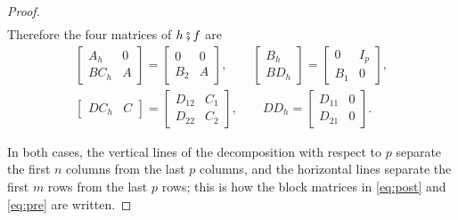 \documentclass[11pt,a4paper]{article}
\theoremstyle{plain}
\theoremstyle{definition}
\theoremstyle{remark}
\newcommand{\then}{\mathbin{\fatsemi}}
\begin{document}
\begin{proof}
\begin{gather*}
    \end{gather*}
    Therefore the four matrices of $h \then f$ are
    \begin{gather*}
        \begin{bmatrix} A_h & 0 \\ B C_h & A \end{bmatrix} = \begin{bmatrix} 0 & 0 \\ B_2 & A \end{bmatrix},
        \qquad
        \begin{bmatrix} B_h \\ B D_h \end{bmatrix} = \begin{bmatrix} 0 & I_p \\ B_1 & 0 \end{bmatrix}, \\
        \begin{bmatrix} D C_h & C \end{bmatrix} = \begin{bmatrix} D_{12} & C_1 \\ D_{22} & C_2 \end{bmatrix},
        \qquad
        D D_h = \begin{bmatrix} D_{11} & 0 \\ D_{21} & 0 \end{bmatrix} .
    \end{gather*}

    In both cases, the vertical lines of the decomposition with respect to $p$ separate the first $n$ columns from the last $p$ columns, and the horizontal lines separate the first $m$ rows from the last $p$ rows; this is how the block matrices in \cref{eq:post} and \cref{eq:pre} are written.
\end{proof}
\end{document}
